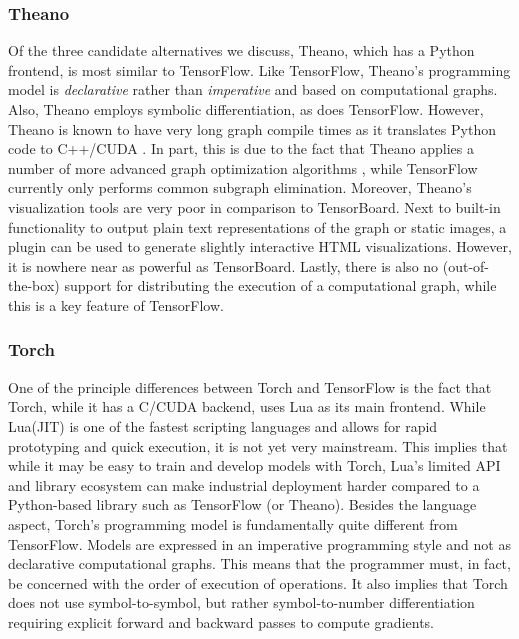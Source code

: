 \subsubsection{Theano}\label{sec:comp-quality-theano}

Of the three candidate alternatives we discuss, Theano, which has a Python
frontend, is most similar to TensorFlow. Like TensorFlow, Theano's programming
model is \emph{declarative} rather than \emph{imperative} and based on
computational graphs. Also, Theano employs symbolic differentiation, as does
TensorFlow. However, Theano is known to have very long graph compile times as it
translates Python code to C++/CUDA \cite{theano}. In part, this is due to the
fact that Theano applies a number of more advanced graph optimization algorithms
\cite{theano}, while TensorFlow currently only performs common subgraph
elimination. Moreover, Theano's visualization tools are very poor in comparison
to TensorBoard. Next to built-in functionality to output plain text
representations of the graph or static images, a plugin can be used to generate
slightly interactive HTML visualizations. However, it is nowhere near as
powerful as TensorBoard. Lastly, there is also no (out-of-the-box) support for
distributing the execution of a computational graph, while this is a key feature
of TensorFlow.

\subsubsection{Torch}\label{sec:comp-quality-torch}

One of the principle differences between Torch and TensorFlow is the fact that
Torch, while it has a C/CUDA backend, uses Lua as its main frontend. While
Lua(JIT) is one of the fastest scripting languages and allows for rapid
prototyping and quick execution, it is not yet very mainstream. This implies
that while it may be easy to train and develop models with Torch, Lua's limited
API and library ecosystem can make industrial deployment harder compared to a
Python-based library such as TensorFlow (or Theano). Besides the language
aspect, Torch's programming model is fundamentally quite different from
TensorFlow. Models are expressed in an imperative programming style and not as
declarative computational graphs. This means that the programmer must, in fact,
be concerned with the order of execution of operations. It also implies that
Torch does not use symbol-to-symbol, but rather symbol-to-number differentiation
requiring explicit forward and backward passes to compute gradients.

